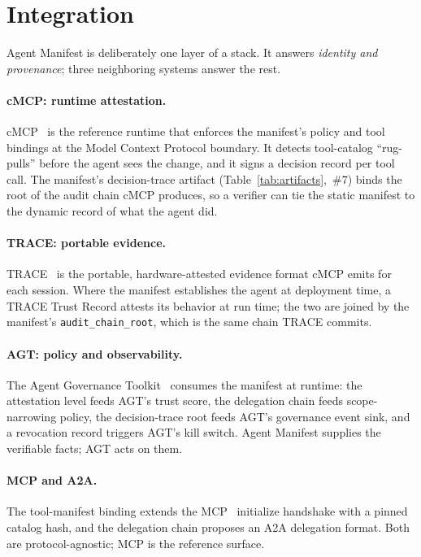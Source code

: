 \section{Integration}
\label{sec:integration}

Agent Manifest is deliberately one layer of a stack. It answers \emph{identity and
provenance}; three neighboring systems answer the rest.

\paragraph{cMCP: runtime attestation.}
cMCP~\citep{cmcp2026} is the reference runtime that enforces the manifest's policy and
tool bindings at the Model Context Protocol boundary. It detects tool-catalog
``rug-pulls'' before the agent sees the change, and it signs a decision record per
tool call. The manifest's decision-trace artifact (Table~\ref{tab:artifacts},~\#7)
binds the root of the audit chain cMCP produces, so a verifier can tie the static
manifest to the dynamic record of what the agent did.

\paragraph{TRACE: portable evidence.}
TRACE~\citep{trace2026} is the portable, hardware-attested evidence format cMCP emits
for each session. Where the manifest establishes the agent at deployment time, a TRACE
Trust Record attests its behavior at run time; the two are joined by the manifest's
\texttt{audit\_chain\_root}, which is the same chain TRACE commits.

\paragraph{AGT: policy and observability.}
The Agent Governance Toolkit~\citep{agt2026} consumes the manifest at runtime: the
attestation level feeds AGT's trust score, the delegation chain feeds scope-narrowing
policy, the decision-trace root feeds AGT's governance event sink, and a revocation
record triggers AGT's kill switch. Agent Manifest supplies the verifiable facts; AGT
acts on them.

\paragraph{MCP and A2A.}
The tool-manifest binding extends the MCP~\citep{mcp2024} initialize handshake with a
pinned catalog hash, and the delegation chain proposes an A2A delegation format. Both
are protocol-agnostic; MCP is the reference surface.
